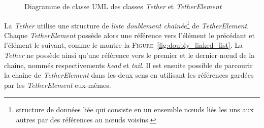 				\begin{figure}[!htb]
					\centering
					\caption{Diagramme de classe UML des classes \textit{Tether} et \textit{TetherElement}}
					\label{fig:uml_class}
				\end{figure}
				
				La \textit{Tether} utilise une structure de \textit{liste doublement chaînée}\footnote{structure de données liée qui consiste en un ensemble n\oe uds liés les uns aux autres par des références au n\oe uds voisins.} de \textit{TetherElement}. Chaque \textit{TetherElement} possède alors une référence vers l'élément le précédant et l'élément le suivant, comme le montre la \textsc{Figure}~\ref{fig:doubly_linked_list}. La \textit{Tether} ne possède ainsi qu'une référence vers le premier et le dernier n\oe ud de la chaîne, nommés respectivements \textit{head} et \textit{tail}. Il est ensuite possible de parcourir la chaîne de \textit{TetherElement} dans les deux sens en utilisant les références gardées par les \textit{TetherElement} eux-mêmes. 
			
